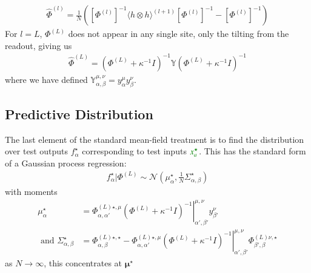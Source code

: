 \documentclass[../main.tex]{subfiles}
\begin{document}
\begin{align}
  \hat \Phi^{(l)} = \frac1N \left( [\Phi^{(l)}]^{-1} \langle h \otimes h \rangle^{(l+1)} [\Phi^{(l)}]^{-1} - [\Phi^{(l)}]^{-1} \right)
  \label{eq:backward-pass}
\end{align}
For $l=L$, $\Phi^{(L)}$ does not appear in any single site, only the tilting from the readout, giving us
\begin{align*}
  \hat \Phi^{(L)} = 
    (\Phi^{(L)} + \kappa^{-1} I)^{-1}
    \mathbb Y
    (\Phi^{(L)} + \kappa^{-1} I)^{-1}
\end{align*}
where we have defined $\mathbb Y^{\mu,\nu}_{\alpha,\beta} = y^{\mu}_{\alpha} y^{\nu}_{\beta}$.

\subsection{Predictive Distribution}

The last element of the standard mean-field treatment is to find the distribution over test outputs $f^{\star}_{\alpha}$ corresponding to test inputs $\typo{x^{\star}_a}$. This has the standard form of a Gaussian process regression:
\begin{align*}
  f^{\star}_{\alpha} | \Phi^{(L)} \sim
    \mathcal N (\mu^{\star}_{\alpha}, \frac1N \Sigma^{\star}_{\alpha,\beta})
\end{align*}
with moments
\begin{align*}
  \mu^{\star}_{\alpha} & = 
    \Phi^{(L)\star,\mu}_{\alpha,\alpha'}
    \left. (\Phi^{(L)} + \kappa^{-1} I)^{-1} \right|^{\mu,\nu}_{\alpha',\beta'}
    y^{\nu}_{\beta'}
  \\ 
  \text{ and }
  \Sigma^{\star}_{\alpha,\beta} & =
    \Phi^{(L)\star,\star}_{\alpha,\beta} 
    - \Phi^{(L)\star,\mu}_{\alpha,\alpha'}
    \left. (\Phi^{(L)} + \kappa^{-1} I)^{-1} \right|^{\mu,\nu}_{\alpha',\beta'}
    \Phi^{(L)\nu,\star}_{\beta',\beta}
\end{align*}
as $N \rightarrow \infty$, this concentrates at $\mathbf{\mu}^{\star}$
\end{document}

